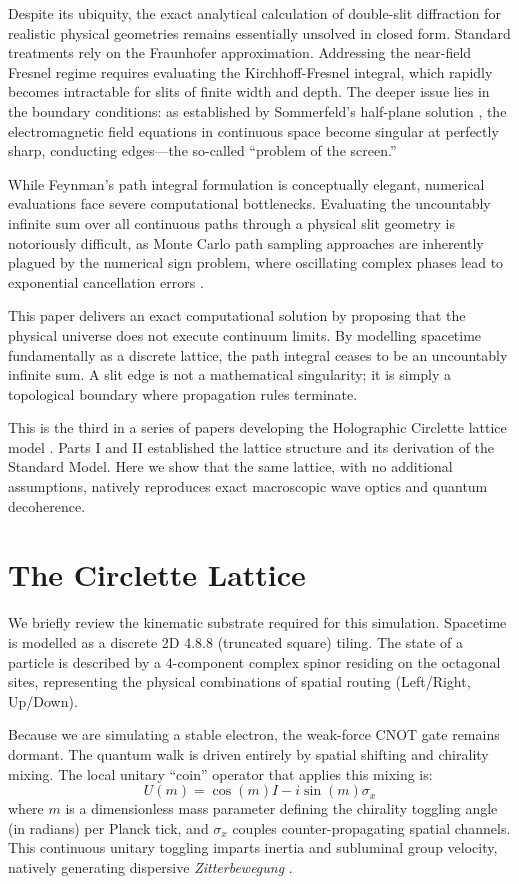 \documentclass[submission, Phys]{SciPost}
\begin{document}
Despite its ubiquity, the exact analytical calculation of double-slit diffraction for realistic physical geometries remains essentially unsolved in closed form. Standard treatments rely on the Fraunhofer approximation. Addressing the near-field Fresnel regime requires evaluating the Kirchhoff-Fresnel integral, which rapidly becomes intractable for slits of finite width and depth. The deeper issue lies in the boundary conditions: as established by Sommerfeld's half-plane solution \cite{sommerfeld1896}, the electromagnetic field equations in continuous space become singular at perfectly sharp, conducting edges---the so-called ``problem of the screen.''

While Feynman's path integral formulation is conceptually elegant, numerical evaluations face severe computational bottlenecks. Evaluating the uncountably infinite sum over all continuous paths through a physical slit geometry is notoriously difficult, as Monte Carlo path sampling approaches are inherently plagued by the numerical sign problem, where oscillating complex phases lead to exponential cancellation errors \cite{gondran2005}.

This paper delivers an exact computational solution by proposing that the physical universe does not execute continuum limits. By modelling spacetime fundamentally as a discrete lattice, the path integral ceases to be an uncountably infinite sum. A slit edge is not a mathematical singularity; it is simply a topological boundary where propagation rules terminate. 

This is the third in a series of papers developing the Holographic Circlette lattice model \cite{elliman2026part1, elliman2026part2}. Parts I and II established the lattice structure and its derivation of the Standard Model. Here we show that the same lattice, with no additional assumptions, natively reproduces exact macroscopic wave optics and quantum decoherence. 

\section{The Circlette Lattice}
\label{sec:lattice}
We briefly review the kinematic substrate required for this simulation. Spacetime is modelled as a discrete 2D 4.8.8 (truncated square) tiling. The state of a particle is described by a 4-component complex spinor residing on the octagonal sites, representing the physical combinations of spatial routing (Left/Right, Up/Down). 

Because we are simulating a stable electron, the weak-force CNOT gate remains dormant. The quantum walk is driven entirely by spatial shifting and chirality mixing. The local unitary ``coin'' operator that applies this mixing is:
\begin{equation}
U(m) = \cos(m) I - i \sin(m) \sigma_x
\end{equation}
where $m$ is a dimensionless mass parameter defining the chirality toggling angle (in radians) per Planck tick, and $\sigma_x$ couples counter-propagating spatial channels. This continuous unitary toggling imparts inertia and subluminal group velocity, natively generating dispersive \textit{Zitterbewegung} \cite{elliman2026part1}.
\end{document}
